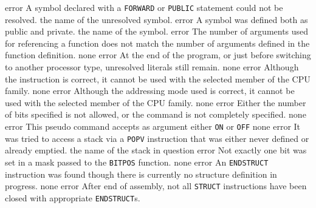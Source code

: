 \documentclass[12pt,twoside]{report}
\newcommand{\tty}[1]{{\tt #1}}
\begin{document}
\begin{description}
               {error}
               {A symbol declared with a \tty{FORWARD} or \tty{PUBLIC} statement could
                not be resolved.}
               {the name of the unresolved symbol.}
               {error}
               {A symbol was defined both as public and private.}
               {the name of the symbol.}
               {error}
               {The number of arguments used for referencing a function
                does not match the number of arguments defined in the
                function definition.}
               {none}
               {error}
               {At the end of the program, or just before switching to
                another processor type, unresolved literals still remain.}
               {none}
               {error}
               {Although the instruction is correct, it cannot be used with
                the selected member of the CPU family.}
               {none}
               {error}
               {Although the addressing mode used is correct, it cannot be
                used with the selected member of the CPU family.}
               {none}
               {error}
               {Either the number of bits specified is not allowed, or
                the command is not completely specified.}
               {none}
               {error}
               {This pseudo command accepts as argument either \tty{ON} or
                \tty{OFF}}
               {none}
               {error}
               {It was tried to access a stack via a \tty{POPV} instruction
                that was either never defined or already emptied.}
               {the name of the stack in question}
               {error}
               {Not exactly one bit was set in a mask passed to the
                \tty{BITPOS} function.}
               {none}
               {error}
               {An \tty{ENDSTRUCT} instruction was found though there is
                currently no structure definition in progress.}
               {none}
               {error}
               {After end of assembly, not all \tty{STRUCT} instructions
                have been closed with appropriate \tty{ENDSTRUCT}s.}

\end{description}
\end{document}
